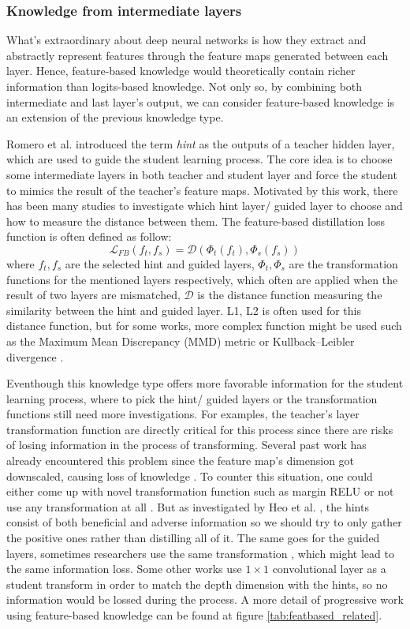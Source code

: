 \subsubsection{Knowledge from intermediate layers}
What's extraordinary about deep neural networks is how they extract and abstractly represent features through the feature maps generated between each layer. Hence, feature-based knowledge would theoretically contain richer information than logits-based knowledge. Not only so, by combining both intermediate and last layer's output, we can consider feature-based knowledge is an extension of the previous knowledge type.

Romero et al. \cite{featurebased01} introduced the term \textit{hint} as the outputs of a teacher hidden layer, which are used to guide the student learning process. The core idea is to choose some intermediate layers in both teacher and student layer and force the student to mimics the result of the teacher's feature maps. Motivated by this work, there has been many studies to investigate which hint layer/ guided layer to choose and how to measure the distance between them. The feature-based distillation loss function is often defined as follow:
\[
      \mathcal{L}_{FB}(f_t, f_s) = \mathcal{D}(\Phi_t(f_t), \Phi_s(f_s))
\]
where $f_t, f_s$ are the selected hint and guided layers, $\Phi_t, \Phi_s$ are the transformation functions for the mentioned layers respectively, which often are applied when the result of two layers are mismatched, $\mathcal{D}$ is the distance function measuring the similarity between the hint and guided layer. L1, L2 is often used for this distance function, but for some works, more complex function might be used such as the Maximum Mean Discrepancy (MMD) metric \cite{featurebased04_mmd} or Kullback–Leibler divergence \cite{featurebased05_kl}.

Eventhough this knowledge type offers more favorable information for the student learning process, where to pick the hint/ guided layers or the transformation functions still need more investigations. For examples, the teacher's layer transformation function are directly critical for this process since there are risks of losing information in the process of transforming. Several past work has already encountered this problem since the feature map's dimension got downscaled, causing loss of knowledge \cite{featurebased02_AT,featurebased06_meal}. To counter this situation, one could either come up with novel transformation function such as margin RELU\cite{featurebased03_relu} or not use any transformation at all \cite{featurebased01}. But as investigated by Heo et al. \cite{featurebased03_relu}, the hints consist of both beneficial and adverse information so we should try to only gather the positive ones rather than distilling all of it. The same goes for the guided layers, sometimes researchers use the same transformation \cite{featurebased02_AT}, which might lead to the same information loss. Some other works use $1 \times 1$ convolutional layer as a student transform \cite{featurebased01,featurebased03_relu} in order to match the depth dimension with the hints, so no information would be lossed during the process. A more detail of progressive work using feature-based knowledge can be found at figure \ref{tab:featbased_related}.